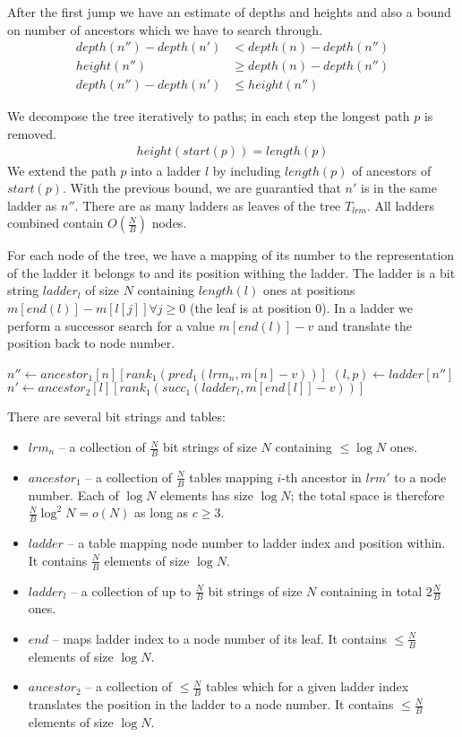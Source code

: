 After the first jump we have an estimate of depths and heights and also a bound on number of ancestors which we have to search through.
\begin{align*}
depth(n'') - depth(n') &< depth(n) - depth(n'') \\
height(n'') &\ge depth(n) - depth(n'') \\
depth(n'') - depth(n') &\le height(n'')
\end{align*}

We decompose the tree iteratively to paths; in each step the longest path $p$ is removed.
\begin{align*}
height(start(p)) = length(p)
\end{align*}
We extend the path $p$ into a ladder $l$ by including $length(p)$ of ancestors of $start(p)$.
With the previous bound, we are guarantied that $n'$ is in the same ladder as $n''$.
There are as many ladders as leaves of the tree $T_{lrm}$.
All ladders combined contain $O\left(\frac{N}{B}\right)$ nodes.

For each node of the tree, we have a mapping of its number to the representation of the ladder it belongs to and its position withing the ladder.
The ladder is a bit string $ladder_l$ of size $N$ containing $length(l)$ ones at positions $m[end(l)] - m[l[j]] \forall j \ge 0$ (the leaf is at position $0$).
In a ladder we perform a successor search for a value $m[end(l)] - v$ and translate the position back to node number.

\begin{algorithmic}
	\State $n'' \gets ancestor_1[n][rank_1(pred_1(lrm_n, m[n] - v))]$
	\State $(l, p) \gets ladder[n'']$ 
	\State $n' \gets ancestor_2[l][rank_1(succ_1(ladder_l, m[end[l]] - v))]$
\EndFunction
\end{algorithmic}

There are several bit strings and tables:
\begin{itemize}
	\item $lrm_n$ -- a collection of $\frac{N}{B}$ bit strings of size $N$ containing $\le \log N$ ones. 
	\item $ancestor_1$ -- a collection of $\frac{N}{B}$ tables mapping $i$-th ancestor in $lrm'$ to a node number.
	Each of $\log N$ elements has size $\log N$; the total space is therefore $\frac{N}{B} \log^2 N = o(N)$ as long as $c \ge 3$.
	\item $ladder$ -- a table mapping node number to ladder index and position within.
	It contains $\frac{N}{B}$ elements of size $\log{N}$.
	\item $ladder_l$ -- a collection of up to $\frac{N}{B}$ bit strings of size $N$ containing in total $2 \frac{N}{B}$ ones.
	\item $end$ -- maps ladder index to a node number of its leaf.
	It contains $\le \frac{N}{B}$ elements of size $\log{N}$.
	\item $ancestor_2$ -- a collection of $\le \frac{N}{B}$ tables which for a given ladder index translates the position in the ladder to a node number.
	It contains $\le \frac{N}{B}$ elements of size $\log{N}$.
\end{itemize}

